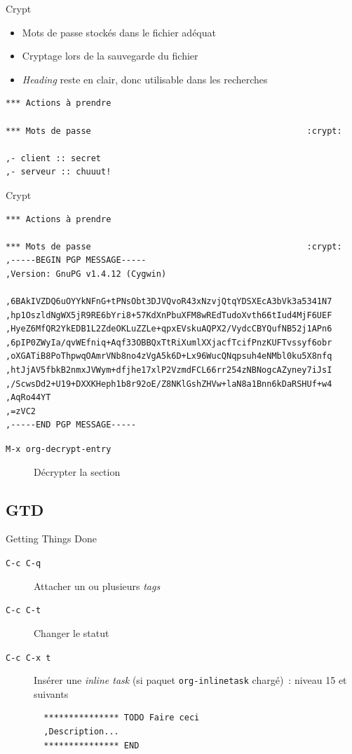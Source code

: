 \documentclass[presentation,t,hideothersubsections]{beamer}
\begin{document}
\begin{frame}[fragile,label=sec-5-2-1]{Crypt}
 \begin{itemize}
\item Mots de passe stockés dans le fichier adéquat
\item Cryptage lors de la sauvegarde du fichier
\item \emph{Heading} reste en clair, donc utilisable dans les recherches
\end{itemize}

\lstset{language=org,numbers=none}
\begin{lstlisting}
*** Actions à prendre

*** Mots de passe                                           :crypt:

,- client :: secret
,- serveur :: chuuut!
\end{lstlisting}
\end{frame}
\begin{frame}[fragile,label=sec-5-2-2]{Crypt}
 \lstset{language=org,numbers=none}
\begin{lstlisting}
*** Actions à prendre

*** Mots de passe                                           :crypt:
,-----BEGIN PGP MESSAGE-----
,Version: GnuPG v1.4.12 (Cygwin)

,6BAkIVZDQ6uOYYkNFnG+tPNsObt3DJVQvoR43xNzvjQtqYDSXEcA3bVk3a5341N7
,hp1OszldNgWX5jR9RE6bYri8+57KdXnPbuXFM8wREdTudoXvth66tIud4MjF6UEF
,HyeZ6MfQR2YkEDB1L2ZdeOKLuZZLe+qpxEVskuAQPX2/VydcCBYQufNB52j1APn6
,6pIP0ZWyIa/qvWEfniq+Aqf33OBBQxTtRiXumlXXjacfTcifPnzKUFTvssyf6obr
,oXGATiB8PoThpwqOAmrVNb8no4zVgA5k6D+Lx96WucQNqpsuh4eNMbl0ku5X8nfq
,htJjAV5fbkB2nmxJVWym+dfjhe17xlP2VzmdFCL66rr254zNBNogcAZyney7iJsI
,/ScwsDd2+U19+DXXKHeph1b8r92oE/Z8NKlGshZHVw+laN8a1Bnn6kDaRSHUf+w4
,AqRo44YT
,=zVC2
,-----END PGP MESSAGE-----
\end{lstlisting}

\begin{description}
\item[\texttt{M-x org-decrypt-entry}] Décrypter la section
\end{description}
\end{frame}
\subsection{GTD}
\label{sec-5-3}

\begin{frame}[fragile,label=sec-5-3-1]{Getting Things Done}
 \begin{description}
\item[\texttt{C-c C-q}] Attacher un ou plusieurs \emph{tags}
\item[\texttt{C-c C-t}] Changer le statut
\item[\texttt{C-c C-x t}] Insérer une \emph{inline task} (si paquet \texttt{org-inlinetask} chargé)~:
niveau 15 et suivants

\lstset{language=org,numbers=none}
\begin{lstlisting}
  *************** TODO Faire ceci
  ,Description...
  *************** END
\end{lstlisting}
\end{description}
\end{frame}
\end{document}
